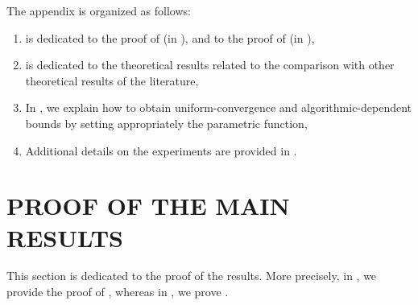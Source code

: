 \documentclass[twoside]{article}
\theoremstyle{plain}
\begin{document}
The appendix is organized as follows:\begin{enumerate}[label={\it (\roman*)}]
    \item {} is dedicated to the proof of  (in ), and to the proof of  (in ),
    \item {} is dedicated to the theoretical results related to the comparison with other theoretical results of the literature,
    \item In , we explain how to obtain uniform-convergence and algorithmic-dependent bounds by setting appropriately the parametric function,
    \item Additional details on the experiments are provided in .
\end{enumerate}

\section{PROOF OF THE MAIN RESULTS}
\label{sec:proof}

This section is dedicated to the proof of the results.
More precisely, in , we provide the proof of , whereas in , we prove .
\end{document}

